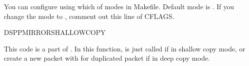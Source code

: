 \documentclass[a4paper,11pt,openany,oneside,english]{sphinxmanual}
\begin{document}
You can configure using which of modes in Makefile. Default mode is
. If you change the mode to , comment out this
line of CFLAGS.

\begin{sphinxVerbatim}[commandchars=\\\{\},formatcom=\footnotesize]
  \PYGZhy{}DSPP\PYGZus{}MIRROR\PYGZus{}SHALLOWCOPY
\end{sphinxVerbatim}

This code is a part of . In this function,
 is just called if in shallow copy
mode, or create a new packet with  for duplicated
packet if in deep copy mode.
\end{document}
